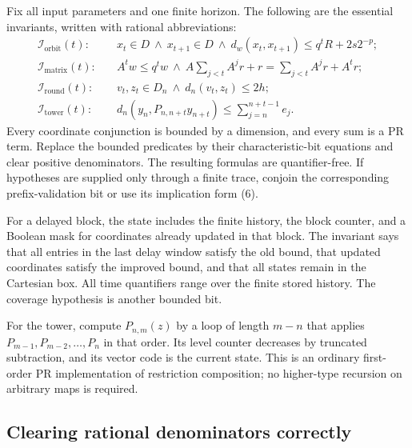 Fix all input parameters and one finite horizon. The following are
the essential invariants, written with rational abbreviations:
\begin{align*}
 \mathcal I_{\mathrm{orbit}}(t):\quad&
 x_t\in D\ \wedge\ x_{t+1}\in D\ \wedge\
 d_w(x_t,x_{t+1})\le q^tR+2s2^{-p};\\
 \mathcal I_{\mathrm{matrix}}(t):\quad&
 A^tw\le q^tw\ \wedge\
 A\sum_{j<t}A^jr+r=\sum_{j<t}A^jr+A^tr;\\
 \mathcal I_{\mathrm{round}}(t):\quad&
 v_t,z_t\in D_n\ \wedge\ d_n(v_t,z_t)\le2h;\\
 \mathcal I_{\mathrm{tower}}(t):\quad&
 d_n(y_n,P_{n,n+t}y_{n+t})\le
       \sum_{j=n}^{n+t-1}e_j.
\end{align*}
Every coordinate conjunction is bounded by a dimension, and every
sum is a PR term. Replace the bounded predicates by their
characteristic-bit equations and clear positive denominators.
The resulting formulas are quantifier-free. If hypotheses are
supplied only through a finite trace, conjoin the corresponding
prefix-validation bit or use its implication form (6).

For a delayed block, the state includes the finite history, the
block counter, and a Boolean mask for coordinates already updated
in that block. The invariant says that all entries in the last
delay window satisfy the old bound, that updated coordinates
satisfy the improved bound, and that all states remain in the
Cartesian box. All time quantifiers range over the finite stored
history. The coverage hypothesis is another bounded bit.

For the tower, compute \(P_{n,m}(z)\) by a loop of length
\(m-n\) that applies \(P_{m-1},P_{m-2},\ldots,P_n\) in
that order. Its level counter decreases by truncated subtraction,
and its vector code is the current state. This is an ordinary
first-order PR implementation of restriction composition; no
higher-type recursion on arbitrary maps is required.

\subsection{Clearing rational denominators correctly}

